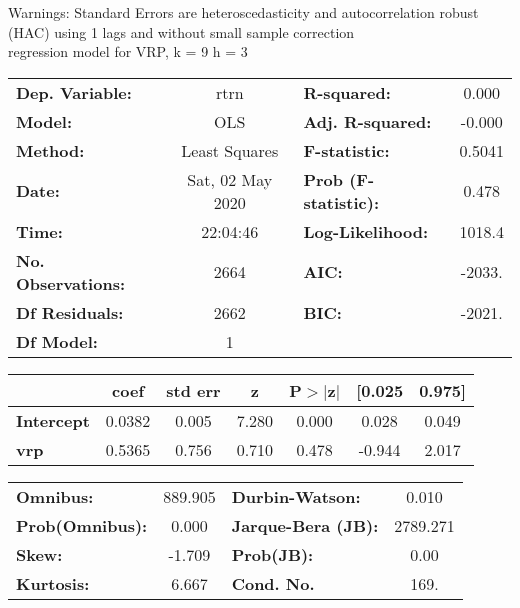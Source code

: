 Warnings: \newline
 [1] Standard Errors are heteroscedasticity and autocorrelation robust (HAC) using 1 lags and without small sample correction\\ 

regression model for VRP, k = 9 h = 3\begin{center}
\begin{tabular}{lclc}
\toprule
\textbf{Dep. Variable:}    &       rtrn       & \textbf{  R-squared:         } &     0.000   \\
\textbf{Model:}            &       OLS        & \textbf{  Adj. R-squared:    } &    -0.000   \\
\textbf{Method:}           &  Least Squares   & \textbf{  F-statistic:       } &    0.5041   \\
\textbf{Date:}             & Sat, 02 May 2020 & \textbf{  Prob (F-statistic):} &    0.478    \\
\textbf{Time:}             &     22:04:46     & \textbf{  Log-Likelihood:    } &    1018.4   \\
\textbf{No. Observations:} &        2664      & \textbf{  AIC:               } &    -2033.   \\
\textbf{Df Residuals:}     &        2662      & \textbf{  BIC:               } &    -2021.   \\
\textbf{Df Model:}         &           1      & \textbf{                     } &             \\
\bottomrule
\end{tabular}
\begin{tabular}{lcccccc}
                   & \textbf{coef} & \textbf{std err} & \textbf{z} & \textbf{P$> |$z$|$} & \textbf{[0.025} & \textbf{0.975]}  \\
\midrule
\textbf{Intercept} &       0.0382  &        0.005     &     7.280  &         0.000        &        0.028    &        0.049     \\
\textbf{vrp}       &       0.5365  &        0.756     &     0.710  &         0.478        &       -0.944    &        2.017     \\
\bottomrule
\end{tabular}
\begin{tabular}{lclc}
\textbf{Omnibus:}       & 889.905 & \textbf{  Durbin-Watson:     } &    0.010  \\
\textbf{Prob(Omnibus):} &   0.000 & \textbf{  Jarque-Bera (JB):  } & 2789.271  \\
\textbf{Skew:}          &  -1.709 & \textbf{  Prob(JB):          } &     0.00  \\
\textbf{Kurtosis:}      &   6.667 & \textbf{  Cond. No.          } &     169.  \\
\bottomrule
\end{tabular}
\end{center}


